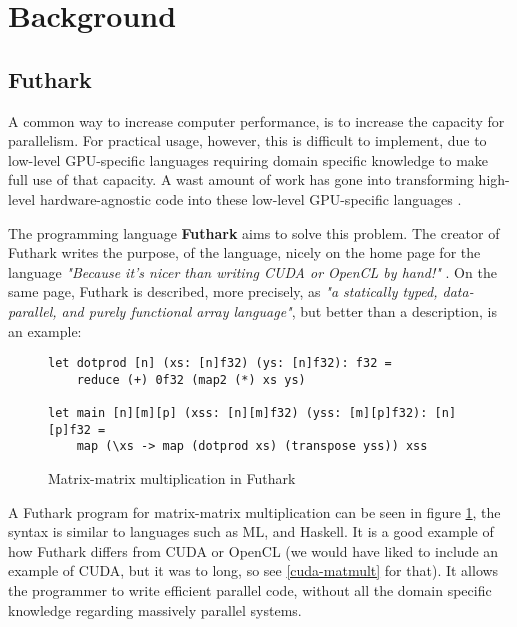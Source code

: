 \section{Background}
\subsection{Futhark}
A common way to increase computer performance, is to increase the capacity for parallelism. For practical usage, however, this is difficult to implement, due to low-level GPU-specific languages requiring domain specific knowledge to make full use of that capacity. A wast amount of work has gone into transforming high-level hardware-agnostic code into these low-level GPU-specific languages \cite{inc-flat}. 

The programming language \textbf{Futhark} aims to solve this problem. The creator of Futhark writes the purpose, of the language, nicely on the home page for the language \textit{"Because it’s nicer than writing CUDA or OpenCL by hand!"} \cite{futhark-home}. On the same page, Futhark is described, more precisely, as \textit{"a statically typed, data-parallel, and purely functional array language"}, but better than a description, is an example:
\begin{figure}[H]
\centering
\lstset{language=haskell}
\begin{lstlisting}
let dotprod [n] (xs: [n]f32) (ys: [n]f32): f32 =
	reduce (+) 0f32 (map2 (*) xs ys)

let main [n][m][p] (xss: [n][m]f32) (yss: [m][p]f32): [n][p]f32 =
	map (\xs -> map (dotprod xs) (transpose yss)) xss
\end{lstlisting}%
\caption{Matrix-matrix multiplication in Futhark \cite{ppopp}}
\label{matmultFuthark}
\end{figure}
\noindent A Futhark program for matrix-matrix multiplication can be seen in figure \ref{matmultFuthark}, the syntax is similar to languages such as ML, and Haskell. It is a good example of how Futhark differs from CUDA or OpenCL (we would have liked to include an example of CUDA, but it was to long, so see \ref{cuda-matmult} for that). It allows the programmer to write efficient parallel code, without all the domain specific knowledge regarding massively parallel systems. 

